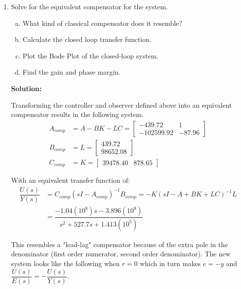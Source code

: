 \documentclass[11pt]{article}
\newcommand{\solution}{\textbf{Solution: \\}}
\begin{document}
\begin{enumerate}[label=\textbf{\arabic*.}]
  \vspace{24pt}
  \item Solve for the equivalent compensator for the system.
  \begin{enumerate}[(a)]
    \itemsep -6pt
    \item What kind of classical compensator does it resemble?
    \item Calculate the closed loop transfer function.
    \item Plot the Bode Plot of the closed-loop system.
    \item Find the gain and phase margin.
  \end{enumerate}
  \solution

  Transforming the controller and observer defined above into an equivalent 
  compensator results in the following system.
  \begin{equation}
    \begin{split}
      A_{comp} &= A - BK - LC =
      \begin{bmatrix}
        -439.72 & 1 \\ -102599.92 & -87.96
      \end{bmatrix} \\
      B_{comp} &= L =
      \begin{bmatrix}
        439.72 \\ 98652.08
      \end{bmatrix} \\
      C_{comp} &= K =
      \begin{bmatrix}
        39478.40 & 878.65
      \end{bmatrix}
    \end{split}
  \end{equation}

  With an equivalent transfer function of:
  \begin{equation}
    \begin{split}
      \dfrac{U(s)}{Y(s)} & = C_{comp}(sI-A_{comp})^{-1}B_{comp} 
      = -K(sI - A + BK + LC)^{-1}L \\
      &= \dfrac{-1.04(10^8)s - 3.896(10^9)}{s^2 + 527.7s + 1.413(10^5)}
    \end{split}
  \end{equation}

  This resembles a "lead-lag" compensator because of the extra pole in the 
  denominator (first order numerator, second order denominator). The new system 
  looks like the following when $r=0$ which in turn makes $e=-y$ and 
  $\dfrac{U(s)}{E(s)} = -\dfrac{U(s)}{Y(s)}$.


\end{enumerate}
\end{document}
